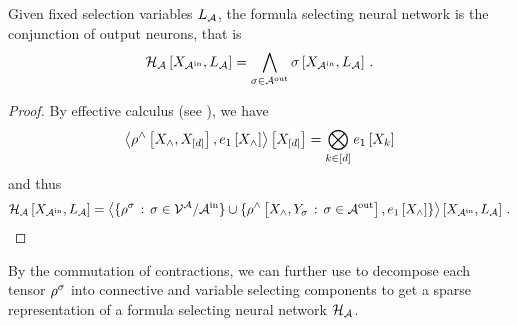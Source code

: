 \begin{theorem}
	Given fixed selection variables $L_{\mathcal{A}}$, the formula selecting neural network is the conjunction of output neurons, that is
	\begin{align*}
		\mathcal{H}_{\mathcal{A}}\left[X_{\mathcal{A}^{\mathrm{in}}},L_{\mathcal{A}}\right] = \bigwedge_{\sigma\in\mathcal{A}^{\mathrm{out}}} \sigma\left[X_{\mathcal{A}^{\mathrm{in}}},L_{\mathcal{A}}\right] \, . 
	\end{align*}
\end{theorem}
\begin{proof}
	By effective calculus (see ), we have
		\[ \left\langle \rho^{\land}\left[X_{\land},X_{[d]}\right],e_{1}\left[X_{\land}\right]\right\rangle \left[ X_{[d]} \right] = \bigotimes_{k\in[d]} e_{1}\left[X_{k}\right] \]
	and thus
	\begin{align*}
		\mathcal{H}_{\mathcal{A}}\left[X_{\mathcal{A}^{\mathrm{in}}},L_{\mathcal{A}}\right]
		= \left\langle 
			\{\rho^{\sigma} \, : \, \sigma\in\mathcal{V}^{\mathcal{A}}/\mathcal{A}^{\mathrm{in}} \} \cup \{\rho^{\land}\left[X_{\land},Y_{\sigma}  \, : \, \sigma\in\mathcal{A}^{\mathrm{out}}\right], e_{1}\left[X_{\land}\right]\}
		\right\rangle \left[ X_{\mathcal{A}^{\mathrm{in}}},L_{\mathcal{A}} \right] \, . 
	\end{align*}
\end{proof}


By the commutation of contractions, we can further use  to decompose each tensor $\rho^{\sigma}$ into connective and variable selecting components to get a sparse representation of a formula selecting neural network $\mathcal{H}_{\mathcal{A}}$.



